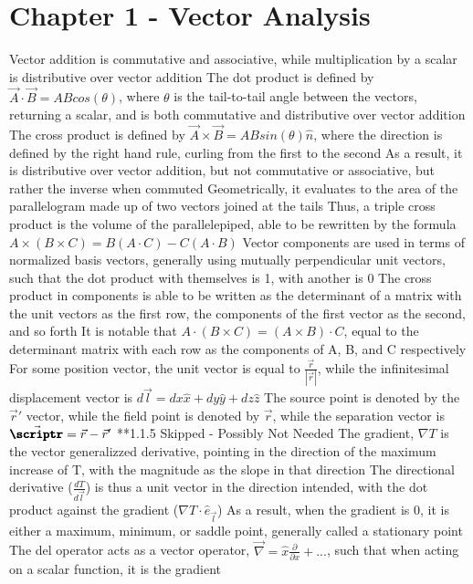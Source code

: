 \documentclass[11 pt, twoside]{article}
\newenvironment{outline*}
{
	\begin{outline}[enumerate]
	}
	{\end{outline}
}
\begin{document}
\section{Chapter 1 - Vector Analysis}
\begin{outline*}
\1 Vector addition is commutative and associative, while multiplication by a scalar is distributive over vector addition
\1 The dot product is defined by $\vec{A} \cdot \vec{B} = ABcos(\theta)$, where $\theta$ is the tail-to-tail angle between the vectors, returning a scalar, and is both commutative and distributive over vector addition
\1 The cross product is defined by $\vec{A} \times \vec{B} = ABsin(\theta)\hat{n}$, where the direction is defined by the right hand rule, curling from the first to the second
	\2 As a result, it is distributive over vector addition, but not commutative or associative, but rather the inverse when commuted
	\2 Geometrically, it evaluates to the area of the parallelogram made up of two vectors joined at the tails
		\3 Thus, a triple cross product is the volume of the parallelepiped, able to be rewritten by the formula $A \times (B \times C) = B(A \cdot C) - C(A \cdot B)$
\1 Vector components are used in terms of normalized basis vectors, generally using mutually perpendicular unit vectors, such that the dot product with themselves is 1, with another is 0
	\2 The cross product in components is able to be written as the determinant of a matrix with the unit vectors as the first row, the components of the first vector as the second, and so forth
	\2 It is notable that $A \cdot (B \times C) = (A \times B) \cdot C$, equal to the determinant matrix with each row as the components of A, B, and C respectively
\1 For some position vector, the unit vector is equal to $\frac{\vec{r}}{|\vec{r}|}$, while the infinitesimal displacement vector is $d\vec{l} = dx\hat{x} + dy\hat{y} + dz\hat{z}$
	\2 The source point is denoted by the $\vec{r}'$ vector, while the field point is denoted by $\vec{r}$, while the separation vector is $\vec{\pmb{\scriptr}} = \vec{r} - \vec{r}'$
\1 **1.1.5 Skipped - Possibly Not Needed
\1 The gradient, $\nabla T$ is the vector generalizzed derivative, pointing in the direction of the maximum increase of T, with the magnitude as the slope in that direction
	\2 The directional derivative ($\frac{dT}{d\vec{l}}$) is thus a unit vector in the direction intended, with the dot product against the gradient ($\nabla T \cdot \hat{e}_{\vec{l}}$)
	\2 As a result, when the gradient is 0, it is either a maximum, minimum, or saddle point, generally called a stationary point
	\2 The del operator acts as a vector operator, $\vec{\nabla} = \hat{x}\frac{\partial}{\partial x} + ...$, such that when acting on a scalar function, it is the gradient

\end{outline*}
\end{document}
